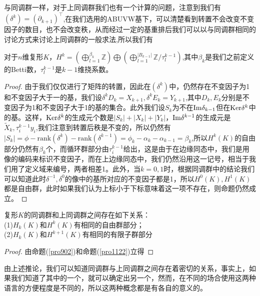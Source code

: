 与同调群一样，对于上同调群我们也有一个计算的问题，注意到我们有$(\delta^{k})=(\partial_{k+1})^{\top}$,在我们选用的ABUVW基下，可以清楚看到转置不会改变不变因子的数目，也不会改变秩，从而经过一定的基重排后我们可以以与同调群相同的讨论方式来讨论上同调群的一般求法,所以我们有
\begin{proposition}\label{pro1122}
对于$n$维复形$K$，$H^{k}=\left(\bigoplus\limits_{l=1}^{\beta_{k}}\mathbb{Z}\right)\bigoplus\left(\bigoplus\limits_{l=1}^{|B_{k-1}|}\mathbb{Z}/\tau_{l}^{k-1}\right)$,其中$\beta_{k}$是我们之前定义的Betti数，$\tau_{l}^{k-1}$是$k-1$维挠系数。
\end{proposition}
\begin{proof}
由于我们仅仅进行了矩阵的转置，因此在$(\delta^{k})$中，仍然存在不变因子为1和不变因子大于一的基，我们设$\delta^{k}D_{k}=X_{k+1},\delta^{k}E_{k}=Y_{k+1}$,其中$D_{k},E_{k}$分别是不变因子为1和不变因子大于1的基的集合。此外我们设$S_{k}$为不在${\rm Im}\delta_{k-1}$但在${\rm Ker}\delta^{k}$中的基。这样，${\rm Ker}\delta^{k}$的生成元个数是$|{S}_{k}|+|{X}_{k}|+|{Y}_{k}|$，${\rm Im}\delta^{k-1}$的生成元是$\tilde{X}_{k},\tau^{k-1}_{i} y_{i}$,我们注意到转置后秩是不变的，所以仍然有$|S_{k}|=\phi-\text{rank}(\delta^{k})-\text{rank}(\delta^{k-1})=\phi_{k}-\alpha_{k}-\alpha_{k-1}=\beta_{k}$,所以$H^{k}(K)$的自由部分仍然有$\beta_{k}$个，而循环群部分由$\tau^{k-1}_{i}$给出，这是由于在边缘同态中，我们是用像的编码来标识不变因子，而在上边缘同态中，我们仍然沿用这一记号，相当于我们用了定义域来编号，两者相差1。此外，当$k=0,1$时，根据同调群中的结论我们可以知道此时$\delta^{-1},\delta^{0}$的像中的基所对应的不变因子都是1，所以$H^{0}(K),H^{1}(K)$都是自由群，此时如果我们认为上标小于下标意味着这一项不存在，则命题仍然成立。
\end{proof}
\begin{corollary}
复形$K$的同调群和上同调群之间存在如下关系：\\
(1)$H_{k}(K)$和$H^{k}(K)$有相同的自由群部分；\\
(2)$H_{k}(K)$和$H^{k+1}(K)$有相同的有限子群部分
\end{corollary}
\begin{proof}
由命题(\ref{pro902})和命题(\ref{pro1122})立得
\end{proof}
由上述推论，我们可以知道同调群与上同调群之间存在着密切的关系，事实上，如果我们知道了其中的一个，就可以确定出另一个，然而，在不同的场合使用这两种语言的方便程度是不同的，所以这两种概念都是有各自的意义的。

